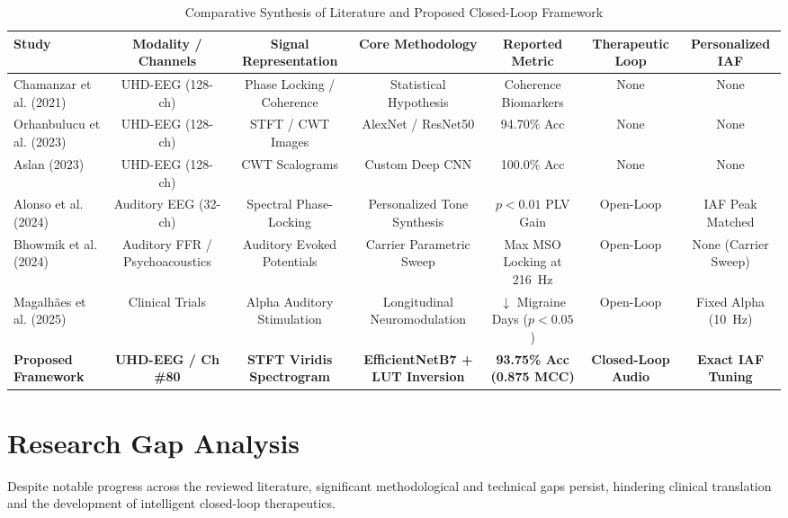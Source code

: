 \documentclass[12pt, a4paper]{report}
\begin{document}
\begin{table}[htbp]
\centering
\caption{Comparative Synthesis of Literature and Proposed Closed-Loop Framework}
\label{tab:lit_comparison}
\begin{adjustbox}{width=0.98\textwidth}
\begin{tabular}{lcccccc}
\toprule
\textbf{Study} & \textbf{Modality / Channels} & \textbf{Signal Representation} & \textbf{Core Methodology} & \textbf{Reported Metric} & \textbf{Therapeutic Loop} & \textbf{Personalized IAF} \\
\midrule
Chamanzar et al. (2021) \cite{chamanzar2021uhd} & UHD-EEG (128-ch) & Phase Locking / Coherence & Statistical Hypothesis & Coherence Biomarkers & None & None \\
Orhanbulucu et al. (2023) \cite{orhanbulucu2023hybrid} & UHD-EEG (128-ch) & STFT / CWT Images & AlexNet / ResNet50 & 94.70\% Acc & None & None \\
Aslan (2023) \cite{aslan2023migrainecnn} & UHD-EEG (128-ch) & CWT Scalograms & Custom Deep CNN & 100.0\% Acc & None & None \\
Alonso et al. (2024) \cite{alonso2024individualized} & Auditory EEG (32-ch) & Spectral Phase-Locking & Personalized Tone Synthesis & $p < 0.01$ PLV Gain & Open-Loop & IAF Peak Matched \\
Bhowmik et al. (2024) \cite{bhowmik2024carrier} & Auditory FFR / Psychoacoustics & Auditory Evoked Potentials & Carrier Parametric Sweep & Max MSO Locking at 216~Hz & Open-Loop & None (Carrier Sweep) \\
Magalh\~aes et al. (2025) \cite{magalhaes2025auditory} & Clinical Trials & Alpha Auditory Stimulation & Longitudinal Neuromodulation & $\downarrow$ Migraine Days ($p < 0.05$) & Open-Loop & Fixed Alpha (10~Hz) \\
\textbf{Proposed Framework} & \textbf{UHD-EEG / Ch \#80} & \textbf{STFT Viridis Spectrogram} & \textbf{EfficientNetB7 + LUT Inversion} & \textbf{93.75\% Acc (0.875 MCC)} & \textbf{Closed-Loop Audio} & \textbf{Exact IAF Tuning} \\
\bottomrule
\end{tabular}
\end{adjustbox}
\end{table}

\section{Research Gap Analysis}
\label{sec:gap_analysis}
Despite notable progress across the reviewed literature, significant methodological and technical gaps persist, hindering clinical translation and the development of intelligent closed-loop therapeutics.
\end{document}
